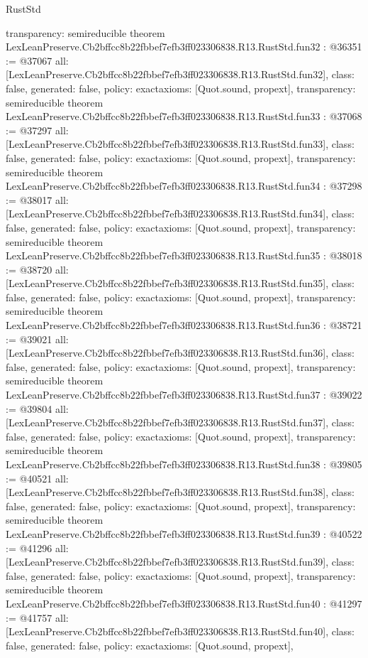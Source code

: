 \begin{lexlean}{RustStd}
\begin{coremodule}
{  transparency: semireducible
}
theorem LexLeanPreserve.Cb2bffcc8b22fbbef7efb3ff023306838.R13.RustStd.fun32 : @36351 := @37067 {
  all: [LexLeanPreserve.Cb2bffcc8b22fbbef7efb3ff023306838.R13.RustStd.fun32],
  class: false,
  generated: false,
  policy: exact{axioms: [Quot.sound, propext]},
  transparency: semireducible
}
theorem LexLeanPreserve.Cb2bffcc8b22fbbef7efb3ff023306838.R13.RustStd.fun33 : @37068 := @37297 {
  all: [LexLeanPreserve.Cb2bffcc8b22fbbef7efb3ff023306838.R13.RustStd.fun33],
  class: false,
  generated: false,
  policy: exact{axioms: [Quot.sound, propext]},
  transparency: semireducible
}
theorem LexLeanPreserve.Cb2bffcc8b22fbbef7efb3ff023306838.R13.RustStd.fun34 : @37298 := @38017 {
  all: [LexLeanPreserve.Cb2bffcc8b22fbbef7efb3ff023306838.R13.RustStd.fun34],
  class: false,
  generated: false,
  policy: exact{axioms: [Quot.sound, propext]},
  transparency: semireducible
}
theorem LexLeanPreserve.Cb2bffcc8b22fbbef7efb3ff023306838.R13.RustStd.fun35 : @38018 := @38720 {
  all: [LexLeanPreserve.Cb2bffcc8b22fbbef7efb3ff023306838.R13.RustStd.fun35],
  class: false,
  generated: false,
  policy: exact{axioms: [Quot.sound, propext]},
  transparency: semireducible
}
theorem LexLeanPreserve.Cb2bffcc8b22fbbef7efb3ff023306838.R13.RustStd.fun36 : @38721 := @39021 {
  all: [LexLeanPreserve.Cb2bffcc8b22fbbef7efb3ff023306838.R13.RustStd.fun36],
  class: false,
  generated: false,
  policy: exact{axioms: [Quot.sound, propext]},
  transparency: semireducible
}
theorem LexLeanPreserve.Cb2bffcc8b22fbbef7efb3ff023306838.R13.RustStd.fun37 : @39022 := @39804 {
  all: [LexLeanPreserve.Cb2bffcc8b22fbbef7efb3ff023306838.R13.RustStd.fun37],
  class: false,
  generated: false,
  policy: exact{axioms: [Quot.sound, propext]},
  transparency: semireducible
}
theorem LexLeanPreserve.Cb2bffcc8b22fbbef7efb3ff023306838.R13.RustStd.fun38 : @39805 := @40521 {
  all: [LexLeanPreserve.Cb2bffcc8b22fbbef7efb3ff023306838.R13.RustStd.fun38],
  class: false,
  generated: false,
  policy: exact{axioms: [Quot.sound, propext]},
  transparency: semireducible
}
theorem LexLeanPreserve.Cb2bffcc8b22fbbef7efb3ff023306838.R13.RustStd.fun39 : @40522 := @41296 {
  all: [LexLeanPreserve.Cb2bffcc8b22fbbef7efb3ff023306838.R13.RustStd.fun39],
  class: false,
  generated: false,
  policy: exact{axioms: [Quot.sound, propext]},
  transparency: semireducible
}
theorem LexLeanPreserve.Cb2bffcc8b22fbbef7efb3ff023306838.R13.RustStd.fun40 : @41297 := @41757 {
  all: [LexLeanPreserve.Cb2bffcc8b22fbbef7efb3ff023306838.R13.RustStd.fun40],
  class: false,
  generated: false,
  policy: exact{axioms: [Quot.sound, propext]},
}
\end{coremodule}
\end{lexlean}
